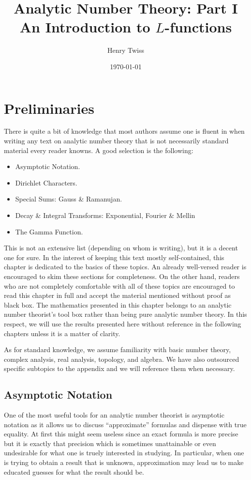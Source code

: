 \documentclass[12pt]{book}
\title{Analytic Number Theory: Part I \\ An Introduction to $L$-functions}
\author{Henry Twiss}
\date{\today}
\theoremstyle{definition}\newframedtheorem{method}{Method}
\newcommand{\<}{\langle}
\renewcommand{\>}{\rangle}
\begin{document}
\maketitle
\thispagestyle{fancy}

\newpage

\tableofcontents

\newpage

\chapter{Preliminaries}
  There is quite a bit of knowledge that most authors assume one is fluent in when writing any text on analytic number theory that is not necessarily standard material every reader knowns. A good selection is the following:
  \begin{itemize}
    \item Asymptotic Notation.
    \item Dirichlet Characters.
    \item Special Sums: Gauss \& Ramanujan.
    \item Decay \& Integral Transforms: Exponential, Fourier \& Mellin
    \item The Gamma Function.
  \end{itemize}
  This is not an extensive list (depending on whom is writing), but it is a decent one for sure. In the interest of keeping this text mostly self-contained, this chapter is dedicated to the basics of these topics. An already well-versed reader is encouraged to skim these sections for completeness. On the other hand, readers who are not completely comfortable with all of these topics are encouraged to read this chapter in full and accept the material mentioned without proof as black box. The mathematics presented in this chapter belongs to an analytic number theorist's tool box rather than being pure analytic number theory. In this respect, we will use the results presented here without reference in the following chapters unless it is a matter of clarity.

  As for standard knowledge, we assume familiarity with basic number theory, complex analysis, real analysis, topology, and algebra. We have also outsourced specific subtopics to the appendix and we will reference them when necessary.
  \section{Asymptotic Notation}
    One of the most useful tools for an analytic number theorist is asymptotic notation as it allows us to discuss ``approximate'' formulas and dispense with true equality. At first this might seem useless since an exact formula is more precise but it is exactly that precision which is sometimes unattainable or even undesirable for what one is truely interested in studying. In particular, when one is trying to obtain a result that is unknown, approximation may lead us to make educated guesses for what the result should be.
\end{document}
